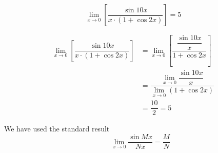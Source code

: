 \documentclass[14pt,fleqn]{extarticle}
\begin{document}
 

\begin{snippet}
    \correct

\[ \lim_{x\to 0}\left[ \dfrac{\sin 10 x}{x\cdot (1+\cos 2x)}\right] = 5 \] 
    
    \reason

\begin{align}
\lim_{x\to 0} \left[ \dfrac{\sin 10 x}{x\cdot (1+\cos 2x)} \right]&= \lim_{x\to 0}\left[\dfrac{\dfrac{\sin 10x}{x}}{1+\cos 2x} \right] \\
&= \dfrac{\lim_{x\to 0}\dfrac{\sin 10x}{x}}{\lim_{x\to 0}(1+\cos 2x)} \\
&= \dfrac{10}{2} = 5
\end{align}

We have used the standard result
\[ \qquad \lim_{x\to 0}\dfrac{\sin Mx}{Nx} = \dfrac{M}{N} \]
    
\end{snippet} 
\end{document}
